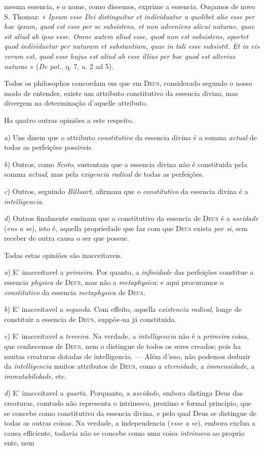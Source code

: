 mesma essencia, e o nome, como dissemos, exprime a essencia. Ouçamos de novo S. Thomaz: « \emph{Ipsum esse Dei distinguitur et individuatur a quolibet alio esse per hoc ipsum, quod est esse per se subsistens, et non adveniens alicui naturae, quae sit aliud ab ipso esse. Omne autem aliud esse, quod non est subsistens, oportet quod individuetur per naturam et substantiam, quae in tali esse subsistit. Et in eis verum est, quod esse hujus est aliud ab esse illius per hoc quod est alterius naturae} » (\emph{De pot.}, q. 7, a. 2 ad 5).\par *\par Todos os philosophos concordam em que em \textsc{Deus}, considerado segundo o nosso modo de entender, existe um attributo constitutivo da essencia divina, mas divergem na determinação d'aquelle attributo.\par Ha quatro outras opiniões a este respeito.\par \emph{a}) Uns dizem que o attributo \emph{constitutivo} da essencia divina é a somma \emph{actual} de todas as perfeições possiveis.\par \emph{b}) Outros, como \emph{Scoto}, sustentam que a essencia divina não é constituida pela somma \emph{actual}, mas pela \emph{exigencia radical} de todas as perfeições.\par \emph{c}) Outros, seguindo \emph{Billuart}, afirmam que o \emph{constitutivo} da essencia divina é a \emph{intelligencia}.\par \emph{d}) Outros finalmente ensinam que o constitutivo da essencia de \textsc{Deus} é a \emph{aseidade} (\emph{ens a se}), isto é, aquella propriedade que faz com que \textsc{Deus} exista \emph{por si}, sem receber de outra causa o ser que possue.\par Todas estas opiniões são inacceitaveis.\par \emph{a}) E' inacceitavel a \emph{primeira}. Por quanto, a \emph{infinidade} das perfeições constitue a essencia \emph{physica} de \textsc{Deus}, mas não a \emph{metaphysica}; e aqui procuramos o \emph{constitutivo} da essencia \emph{metaphysica} de \textsc{Deus}.\par \emph{b}) E' inacceitavel a \emph{segunda}. Com effeito, aquella \emph{existencia radical}, longe de constituir a essencia de \textsc{Deus}, suppõe-na já constituida.\par \emph{c}) E' inacceitavel a \emph{terceira}. Na verdade, a \emph{intelligencia} não é a \emph{primeira} coisa, que conhecemos de \textsc{Deus}, nem o distingue de todos os seres creados; pois ha muitas creaturas dotadas de intelligencia. --- Além d'isso, não podemos deduzir da \emph{intelligencia} muitos attributos de \textsc{Deus}, como a \emph{eternidade}, a \emph{immensidade}, a \emph{immutabilidade}, etc.\par \emph{d}) E' inacceitavel a \emph{quarta}. Porquanto, a \emph{aseidade}, embora distinga Deus das creaturas, comtudo não representa o intrinseco, proximo e formal principio, que se concebe como constitutivo da essencia divina, e pelo qual Deus se distingue de todas as outras coisas. Na verdade, a independencia (\emph{esse a se}), embora exclua a causa efficiente, todavia não se concebe como uma coisa \emph{intrinseca} ao proprio ente, nem 